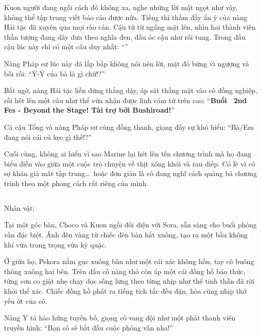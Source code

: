 \documentclass[../main.tex]{subfiles}
\begin{document}
Kuon người đang ngồi cách đó không xa, nghe những lời mật ngọt như vậy, không thể tập trung viết báo cáo được nữa. Tiếng thì thầm đầy ẩn ý của nàng Hải tặc đã xuyên qua mọi rào cản. Cậu từ từ ngẩng mặt lên, nhìn hai thành viên thần tượng đang dây dưa theo nghĩa đen, đầu óc cậu như rối tung. Trong đầu cậu lúc này chỉ có một câu duy nhất: ``''

Nàng Pháp sư lúc này đã lắp bắp không nói nên lời, mặt đỏ bừng vì ngượng và bối rối: ``Ý-Ý của bà là gì chứ!?''

Bất ngờ, nàng Hải tặc liền đứng thẳng dậy, áp sát thẳng mặt vào cô đồng nghiệp, rồi hét lên một câu như thể vừa nhận được linh cảm từ trên cao: ``\textbf{Buổi \hll\ 2nd Fes - Beyond the Stage! Tài trợ bởi Bushiroad!}''

Cả cậu Tổng và nàng Pháp sư cùng đồng thanh, giọng đầy sự khó hiểu: ``Bà/Em đang nói cái củ kẹc gì thế!?''

Cuối cùng, không ai hiểu vì sao Marine lại hét lên tên chương trình mà họ đang biểu diễn vào giữa một cuộc trò chuyện về thịt xông khói và rau diếp. Có lẽ vì cô sợ khán giả mất tập trung\dots\ hoặc đơn giản là cô đang nghĩ cách quảng bá chương trình theo một phong cách rất riêng của mình.

\newpage

\subsection*{\label{ep-S13.II}}
\begin{center}
  {\caviar\fontsize{12pt}{12pt}\selectfont Nhân vật:    }
\end{center}

Tại một góc bàn, Choco và Kuon ngồi đối diện với Sora, sẵn sàng cho buổi phỏng vấn đặc biệt. Ánh đèn vàng từ chiếc đèn bàn hắt xuống, tạo ra một bầu không khí vừa trang trọng vừa kỳ quặc.

Ở giữa họ, Pekora nằm gục xuống bàn như một cái xác không hồn, tay cô buông thõng xuống hai bên. Trên đầu cô nàng thỏ còn áp một cái đồng hồ báo thức, từng cơn co giật nhẹ chạy dọc sống lưng theo từng nhịp như thể tinh thần đã rời khỏi thể xác. Chiếc đồng hồ phát ra tiếng tích tắc đều đặn, hòa cùng nhịp thở yếu ớt của cô.

Nàng Y tá hào hứng tuyên bố, giọng cô vang dội như một phát thanh viên truyền hình: ``Bọn cô sẽ bắt đầu cuộc phỏng vấn nha!''
\end{document}
